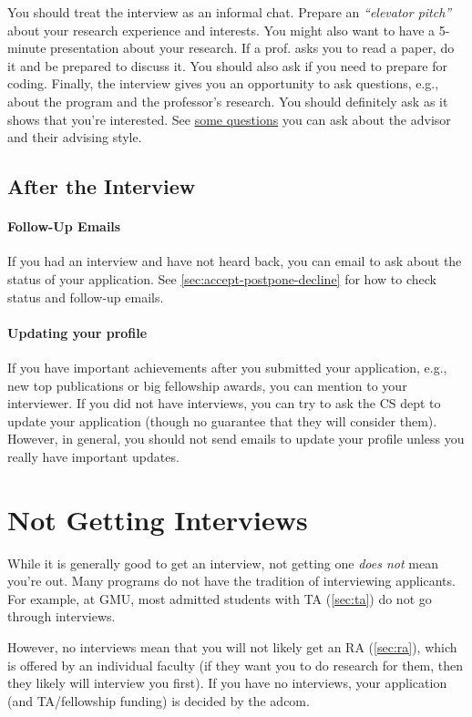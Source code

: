 \documentclass[oneside,11pt]{book}
\begin{document}
You should treat the interview as an informal chat. Prepare an \emph{``elevator pitch''} about your research experience and interests. You might also want to have a 5-minute presentation about your research. If a prof. asks you to read a paper, do it and be prepared to discuss it. You should also ask if you need to prepare for coding. Finally, the interview gives you an opportunity to ask questions, e.g., about the program and the professor's research.  You should definitely ask as it shows that you're interested.  See \href{https://roars.dev/phd-cs-us/advising.pdf}{some questions} you can ask about the advisor and their advising style.

\subsection{After the Interview}

\paragraph{Follow-Up Emails} If you had an interview and have not heard back, you can email to ask about the status of your application. See \autoref{sec:accept-postpone-decline} for how to check status and follow-up emails. 


\paragraph{Updating your profile} If you have important  achievements after you submitted your application, e.g., new top publications or big fellowship awards, you can mention to your interviewer. If you did not have interviews, you can try to ask the CS dept to update your application (though no guarantee that they will consider them). However, in general, you should not send emails to update your profile unless you really have important updates.

\section{Not Getting Interviews}\label{sec:no-interview}
While it is generally good to get an interview, not getting one \emph{does not} mean you're out.  Many programs do not have the tradition of interviewing applicants. For example, at GMU, most admitted students with TA (\autoref{sec:ta}) do not go through interviews.

However, no interviews mean that you will not likely get an RA (\autoref{sec:ra}), which is offered by an individual faculty (if they want you to do research for them, then they likely will interview you first).  If you have no interviews, your application (and TA/fellowship funding) is decided by the adcom.
\end{document}
